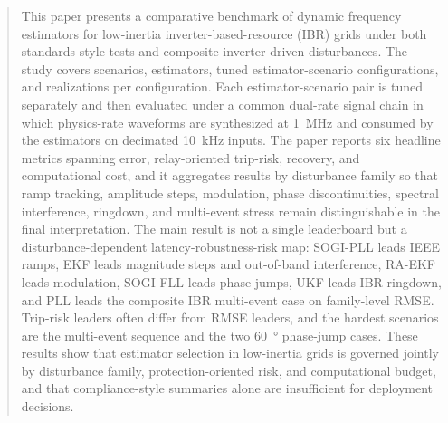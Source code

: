 \begin{abstract}
This paper presents a comparative benchmark of dynamic frequency estimators for low-inertia inverter-based-resource (IBR) grids under both standards-style tests and composite inverter-driven disturbances. The study covers \ArchivalScenarioCount{} scenarios, \ArchivalEstimatorCount{} estimators, \ArchivalPairCount{} tuned estimator-scenario configurations, and \ArchivalMonteCarloRuns{} realizations per configuration. Each estimator-scenario pair is tuned separately and then evaluated under a common dual-rate signal chain in which physics-rate waveforms are synthesized at \SI{1}{MHz} and consumed by the estimators on decimated \SI{10}{kHz} inputs. The paper reports six headline metrics spanning error, relay-oriented trip-risk, recovery, and computational cost, and it aggregates results by disturbance family so that ramp tracking, amplitude steps, modulation, phase discontinuities, spectral interference, ringdown, and multi-event stress remain distinguishable in the final interpretation. The main result is not a single leaderboard but a disturbance-dependent latency-robustness-risk map: SOGI-PLL leads IEEE ramps, EKF leads magnitude steps and out-of-band interference, RA-EKF leads modulation, SOGI-FLL leads phase jumps, UKF leads IBR ringdown, and PLL leads the composite IBR multi-event case on family-level RMSE. Trip-risk leaders often differ from RMSE leaders, and the hardest scenarios are the multi-event sequence and the two \SI{60}{\degree} phase-jump cases. These results show that estimator selection in low-inertia grids is governed jointly by disturbance family, protection-oriented risk, and computational budget, and that compliance-style summaries alone are insufficient for deployment decisions.
\end{abstract}
